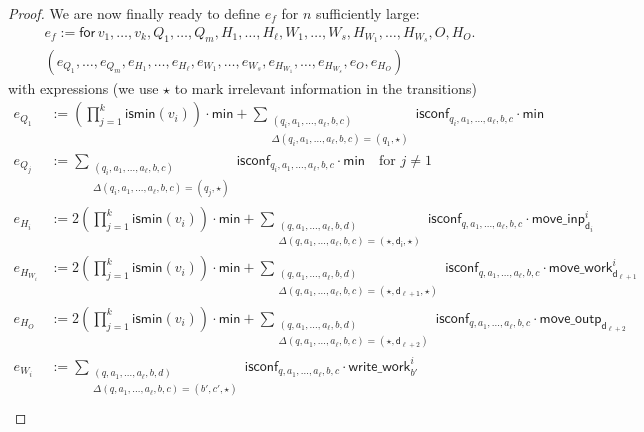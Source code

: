 \begin{proof}
We are now finally ready to define $e_f$ for $n$ sufficiently large:
\begin{multline*}
e_f:= \mathsf{for\,} v_1,\ldots,v_{k},Q_1,\ldots,Q_m,H_1,\ldots,H_\ell,W_1,\ldots,W_s, H_{W_1},\ldots,H_{W_s},O,H_O . \\
(e_{Q_1},\ldots,e_{Q_m},e_{H_1},\ldots,e_{H_\ell},e_{W_1},\ldots,e_{W_s},e_{H_{W_1}},\ldots,e_{H_{W_s}},e_{O}, e_{H_O})
\end{multline*}
with expressions (we use $\star$ to mark irrelevant information in the transitions)
 \allowdisplaybreaks
\begin{align*}
	e_{Q_1}&:=\left(\prod_{j=1}^{k} \textsf{ismin}(v_i)\right)\cdot\mathsf{min}
	+ \sum_{\substack{(q_i,a_1,\ldots,a_\ell,b,c)\\
	\Delta(q_i,a_1,\ldots,a_\ell,b,c)=(q_1,\star)}} \!\!\!\!\!\!\!\!\! \mathsf{isconf}_{q_i,a_1,\ldots,a_\ell,b,c}\cdot \mathsf{min} \\
	e_{Q_j}&:=\sum_{\substack{(q_i,a_1,\ldots,a_\ell,b,c)\\
	\Delta(q_i,a_1,\ldots,a_\ell,b,c)=(q_j,\star)}} \!\!\!\!\!\!\!\!\! \mathsf{isconf}_{q_i,a_1,\ldots,a_\ell,b,c}\cdot \mathsf{min}
	 \quad \text{for $j\neq 1$}\\
	e_{H_i}&:=2\left(\prod_{j=1}^{k} \textsf{ismin}(v_i)\right)\cdot\mathsf{min}
	+\sum_{\substack{(q,a_1,\ldots,a_\ell,b,d)\\
	\Delta(q,a_1,\ldots,a_\ell,b,c)=(\star,\mathsf{d_i},\star)}}\!\!\!\!\!\!\!\!\! \mathsf{isconf}_{q,a_1,\ldots,a_\ell,b,c}\cdot\mathsf{move\_inp}^i_{\mathsf{d}_i}\\
	e_{H_{W_i}}&:=2\left(\prod_{j=1}^{k} \textsf{ismin}(v_i)\right)\cdot\mathsf{min}
	+\sum_{\substack{(q,a_1,\ldots,a_\ell,b,d)\\
	\Delta(q,a_1,\ldots,a_\ell,b,c)=(\star,\mathsf{d_{\ell+1}},\star)}}\!\!\!\!\!\!\!\!\! \mathsf{isconf}_{q,a_1,\ldots,a_\ell,b,c}\cdot\mathsf{move\_work}_{\mathsf{d}_{\ell+1}}^i\\
	e_{H_O}&:=2\left(\prod_{j=1}^{k} \textsf{ismin}(v_i)\right)\cdot\mathsf{min}
	+\sum_{\substack{(q,a_1,\ldots,a_\ell,b,d)\\
	\Delta(q,a_1,\ldots,a_\ell,b,c)=(\star,\mathsf{d}_{\ell+2})}}\!\!\!\!\!\!\!\!\! \mathsf{isconf}_{q,a_1,\ldots,a_\ell,b,c}\cdot\mathsf{move\_outp}_{\mathsf{d}_{\ell+2}}\\
	e_{W_i}&:=\sum_{\substack{(q,a_1,\ldots,a_\ell,b,d)\\
	\Delta(q,a_1,\ldots,a_\ell,b,c)=(b',c',\star)}}\!\!\!\!\!\!\!\!\! \mathsf{isconf}_{q,a_1,\ldots,a_\ell,b,c}\cdot\mathsf{write\_work}_{b'}^i\\

\end{align*}
\end{proof}
